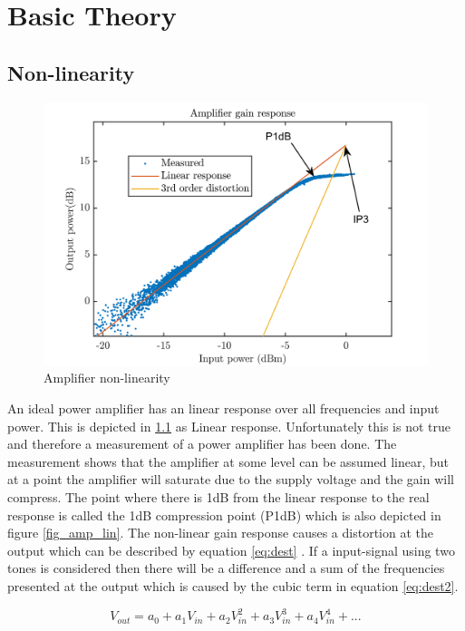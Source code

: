 \chapter{Basic Theory}\label{ch:2}

\section{Non-linearity}

\begin{figure}[H]
\centering 
\includegraphics[scale = 0.8]{figures/ch1/amp_lin.png}
\caption{Amplifier non-linearity}
\label{fig:amp_lin}
\end{figure} 

An ideal power amplifier has an linear response over all frequencies and input power. This is depicted in \ref{fig:amp_lin} as Linear response. Unfortunately this is not true and therefore a measurement of a power amplifier has been done. The measurement shows that the amplifier at some level can be assumed linear, but at a point the amplifier will saturate due to the supply voltage and the gain will compress. The point where there is 1dB from the linear response to the real response is called the 1dB compression point (P1dB) which is also depicted in  figure \ref{fig_amp_lin}. The non-linear gain response causes a distortion at the output which can be described by equation \ref{eq:dest} \citep{NI}. If a input-signal using two tones is considered then there will be a difference and a sum of the frequencies presented at the output which is caused by the cubic term in equation \ref{eq:dest2}.

\begin{equation} \label{eq:dest}
V_{out} = a_0 + a_1 V_{in} + a_2 V_{in}^2 + a_3 V_{in}^3 + a_4 V_{in}^4 + ... 
\end{equation}

